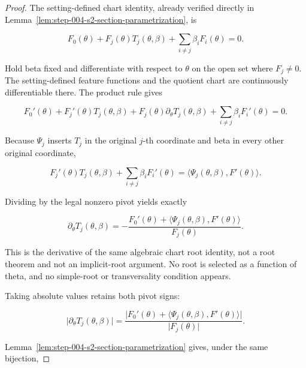 \begin{proof}
The setting-defined chart identity, already verified directly in
Lemma~\ref{lem:step-004-s2-section-parametrization}, is

\begin{equation}
\label{eq:appendix-display-122}
F_0(\theta)+F_j(\theta)T_j(\theta,\beta)
+\sum_{i\neq j}\beta_iF_i(\theta)=0.
\end{equation}

Hold beta fixed and differentiate with respect to \(\theta\) on the open set where \(F_j\neq0\). The
setting-defined feature functions and the quotient chart are continuously differentiable there. The product
rule gives

\begin{equation}
\label{eq:appendix-display-123}
F_0'(\theta)
+F_j'(\theta)T_j(\theta,\beta)
+F_j(\theta)\partial_\theta T_j(\theta,\beta)
+\sum_{i\neq j}\beta_iF_i'(\theta)=0.
\end{equation}

Because \(\Psi_j\) inserts \(T_j\) in the original \(j\)-th coordinate and beta in every other original
coordinate,

\begin{equation}
\label{eq:appendix-display-124}
F_j'(\theta)T_j(\theta,\beta)
+\sum_{i\neq j}\beta_iF_i'(\theta)
=\langle\Psi_j(\theta,\beta),F'(\theta)\rangle.
\end{equation}

Dividing by the legal nonzero pivot yields exactly

\begin{equation}
\label{eq:appendix-display-125}
\partial_\theta T_j(\theta,\beta)
=-
\frac{F_0'(\theta)+\langle\Psi_j(\theta,\beta),F'(\theta)\rangle}
{F_j(\theta)}.
\end{equation}

This is the derivative of the same algebraic chart root identity, not a root theorem and not an implicit-root
argument. No root is selected as a function of theta, and no simple-root or transversality condition appears.

Taking absolute values retains both pivot signs:

\begin{equation}
\label{eq:appendix-display-126}
\lvert\partial_\theta T_j(\theta,\beta)\rvert
=
\frac{\lvert F_0'(\theta)
+\langle\Psi_j(\theta,\beta),F'(\theta)\rangle\rvert}
{\lvert F_j(\theta)\rvert}.
\end{equation}

Lemma~\ref{lem:step-004-s2-section-parametrization} gives, under the same bijection,


\end{proof}
